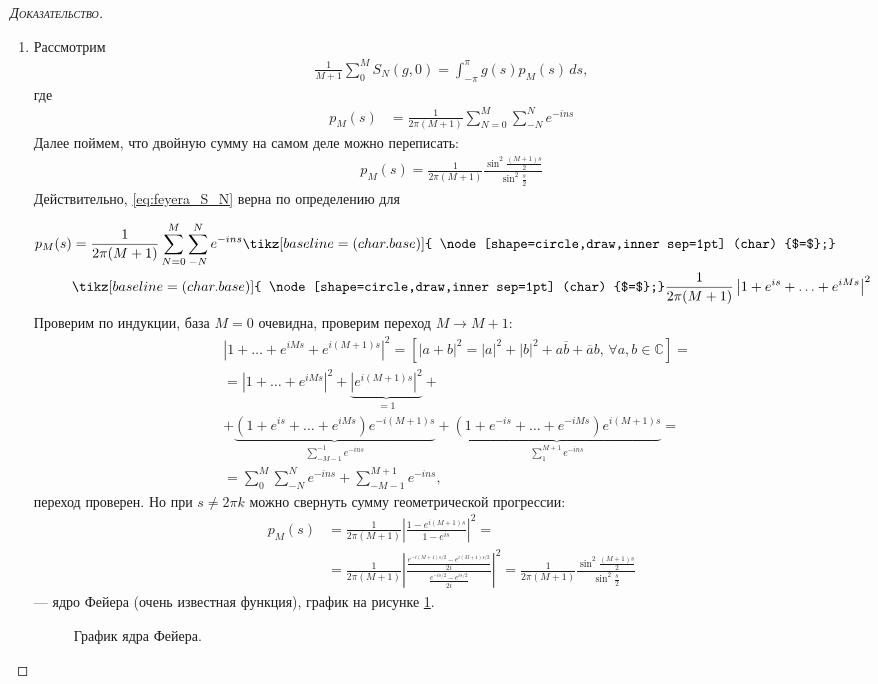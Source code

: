 \documentclass[../complex-analysis.tex]{subfiles}
\begin{document}
\begin{proof}[\normalfont\textsc{Доказательство}]
\begin{enumerate}
\item Рассмотрим 
 \begin{align}
  \label{eq:feyera_S_N}
  \frac{1}{M+1}\sum_{0}^{M} S_N(g,0) = \int_{-\pi}^{\pi}g(s)p_M(s)\,ds,
 \end{align} где
 \begin{align*}
  p_M(s) &= \frac{1}{2\pi (M+1)} \sum_{N=0}^{M} \sum_{-N}^{N} e^{-ins}
 \end{align*} 
 Далее поймем, что двойную сумму на самом деле можно переписать:
 \begin{align*}
  p_M(s) = \frac{1}{2 \pi (M+1)} \frac{ \sin^{2} \frac{(M+1)s}{2}}{\sin^{2} \frac{s}{2}}
 \end{align*} 
 Действительно, \eqref{eq:feyera_S_N} верна по определению для
 {
	 \newcommand*\circled[1]{\tikz[baseline=(char.base)]{
  \node[shape=circle,draw,inner sep=1pt] (char) {#1};}}
 \begin{align*}
	 p_M(s) &= \frac{1}{2\pi (M+1)} \sum_{N=0}^{M} \sum_{-N}^{N} e^{-ins} \circled{$=$} \\
			&\circled{$=$} \frac{1}{2\pi (M+1)} \left| 1 + e^{is} + \ldots + e^{iMs} \right|^{2}
 \end{align*} Проверим \circled{$=$} по индукции, база $ M = 0 $ очевидна, проверим переход $M \to M + 1$: 
 \begin{align*}
  &\left| 1+\ldots+e^{iMs} + e^{i(M+1)s} \right|^{2} = \left[|a + b|^2 = |a|^2 + |b|^2 + a \overline b + \overline a b, \, \forall a, b \in \mathbb C\right] = \\
  &= \left| 1+\ldots+e^{iMs} \right|^{2} + \underbrace{\left| e^{i(M+1)s} \right|^{2}}_{=1} + \\ 
  &+ \underbrace{(1+e^{is}+ \ldots + e^{iMs})e^{-i(M+1)s}}_{\sum_{-M - 1}^{-1} e^{-ins}} + \underbrace{(1 + e^{-is} + \ldots + e^{-iMs})e^{i(M+1)s}}_{\sum_{1}^{M + 1} e^{-ins}} = \\
  &= \sum_{0}^{M} \sum_{-N}^{N}e^{-ins} + \sum_{-M-1}^{M+1} e^{-ins},
 \end{align*} переход проверен. Но при $ s \neq 2\pi k $ можно свернуть сумму геометрической прогрессии:
 \begin{align*}
  p_M(s) &= \frac{1}{2 \pi (M+1)} \left| \frac{1-e^{i(M+1)s}}{1-e^{is}} \right|^{2} = \\
  &= \frac{1}{2 \pi (M+1)}  \left|\frac{\frac{e^{-i(M+1)s / 2} - e^{i(M+1)s / 2}}{2i}}{\frac{e^{-is / 2} - e^{is / 2}}{2i}} \right|^{2} = \frac{1}{2 \pi (M+1)} \frac{ \sin^{2} \frac{(M+1)s}{2}}{\sin^{2} \frac{s}{2}}
 \end{align*} --- ядро Фейера (очень известная функция), график на рисунке \ref{fig:feyer_kernel_plot}.
\begin{figure}[ht]
    \centering
    \caption{График ядра Фейера.}
    \label{fig:feyer_kernel_plot}
\end{figure}
}


\end{enumerate}
\end{proof}
\end{document}
